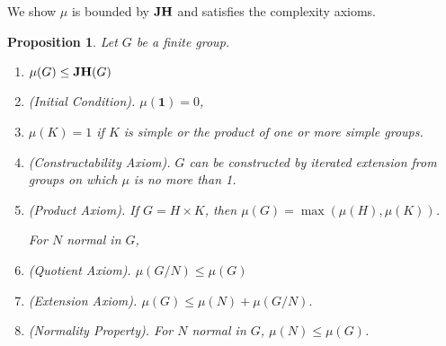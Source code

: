 \documentclass[a4paper,11pt]{amsart}
\newtheorem{proposition}[theorem]{Proposition}
\theoremstyle{definition}
\newcommand{\JH}{{\bf JH}}
\newcommand{\1}{{\mathbf 1}}
\begin{document}
We show $\mu$ is bounded by $\JH$ and satisfies the complexity axioms.
\begin{proposition}\label{mu-axioms}
Let $G$ be a finite group. 
\begin{enumerate}
    \item  \label{bounded} $\mu(G) \leq \JH(G) $
     \item (Initial Condition). $\mu(\1)=0$, \label{mu-init}
     \item $\mu(K) =1$ if $K$ is simple or the product of one or more simple groups. \label{mu-on-mala}
     \item  (Constructability Axiom). \label{mu-construct}
     $G$ can be constructed by iterated extension from groups on which $\mu$ is no more than 1.
    \item (Product Axiom).   \label{mu-product} If $G= H \times K$, then $\mu(G)=\max(\mu(H),\mu(K))$.
    
   For $N$ normal in $G$, 
    
   \item       (Quotient Axiom). $ \mu(G/N) \leq \mu(G)$ \label{mu-quotient}
    \item (Extension Axiom). $\mu(G) \leq \mu(N)+\mu(G/N).$ \label{mu-extension}
   
    \item (Normality Property). \label{mu-normal}
    For $N$ normal in $G$, $\mu(N)\leq \mu(G)$.
\end{enumerate}
\end{proposition}
\end{document}

